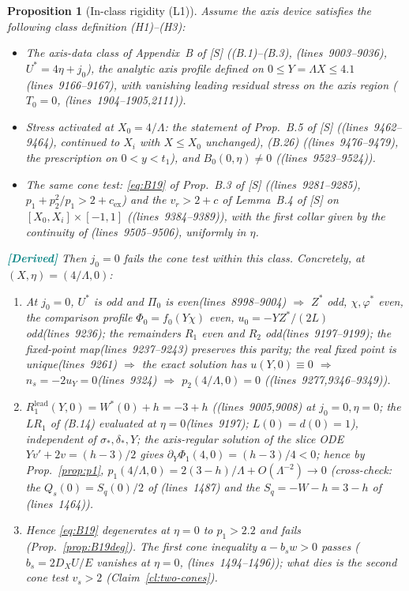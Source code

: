 \documentclass[11pt,a4paper]{article}
\newtheorem{proposition}[theorem]{Proposition}
\theoremstyle{definition}
\theoremstyle{remark}
\newcommand{\lnos}[1]{(lines~#1)}
\newcommand{\DER}{\textcolor{teal}{\textbf{[Derived]}}}
\begin{document}
\begin{proposition}[In-class rigidity (L1)]
\label{prop:L1}
Assume the axis device satisfies the following class definition (H1)--(H3):
\begin{itemize}
\item[(H1)] The axis-data class of Appendix~B of [S] ((B.1)--(B.3), \lnos{9003--9036},
$U^*=4\eta+j_0$), the analytic axis profile defined on $0\le Y=\Lambda X\le 4.1$\lnos{9166--9167},
with vanishing leading residual stress on the axis region ($T_0=0$, \lnos{1904--1905,2111}).
\item[(H2)] Stress activated at $X_0=4/\Lambda$: the statement of Prop.~B.5 of [S] (\lnos{9462--9464},
continued to $X_i$ with $X\le X_0$ unchanged), (B.26) (\lnos{9476--9479}, the prescription on
$0<y<t_1$), and $B_0(0,\eta)\ne 0$ (\lnos{9523--9524}).
\item[(H3)] The same cone test: \eqref{eq:B19} of Prop.~B.3 of [S] (\lnos{9281--9285},
$p_1+p_2^2/p_1>2+c_{\mathrm{ex}}$) and the $v_r>2+c$ of Lemma~B.4 of [S] on
$[X_0,X_i]\times[-1,1]$ (\lnos{9384--9389}), with the first collar given by the continuity of
\lnos{9505--9506}, uniformly in $\eta$.
\end{itemize}
\DER
Then $j_0=0$ fails the cone test within this class. Concretely, at $(X,\eta)=(4/\Lambda,0)$:
\begin{enumerate}
\item At $j_0=0$, $U^*$ is odd and $\Pi_0$ is even\lnos{8998--9004} $\Rightarrow$ $Z^*$ odd,
$\chi,\varphi^*$ even, the comparison profile $\Phi_0=f_0(Y\chi)$ even, $u_0=-YZ^*/(2L)$ odd\lnos{9236};
the remainders $R_1$ even and $R_2$ odd\lnos{9197--9199}; the fixed-point map\lnos{9237--9243}
preserves this parity; the real fixed point is unique\lnos{9261} $\Rightarrow$ the exact solution has
$u(Y,0)\equiv 0$
$\Rightarrow$ $n_s=-2u_Y=0$\lnos{9324} $\Rightarrow$ $p_2(4/\Lambda,0)=0$
(\lnos{9277,9346--9349}).
\item $R_1^{\mathrm{lead}}(Y,0)=W^*(0)+h=-3+h$ (\lnos{9005,9008} at
$j_0=0,\eta=0$; the $LR_1$ of (B.14) evaluated at $\eta=0$\lnos{9197}; $L(0)=d(0)=1$), independent of
$\sigma_*,\delta_*,Y$; the axis-regular solution of the slice ODE
$Yv'+2v=(h-3)/2$ gives $\partial_Y\Phi_1(4,0)=(h-3)/4<0$;
hence by Prop.~\ref{prop:p1}, $p_1(4/\Lambda,0)=2(3-h)/\Lambda+O(\Lambda^{-2})\to 0$
(cross-check: the $Q_s(0)=S_q(0)/2$ of \lnos{1487} and the $S_q=-W-h=3-h$ of \lnos{1464}).
\item Hence \eqref{eq:B19} degenerates at $\eta=0$ to $p_1>2.2$ and fails (Prop.~\ref{prop:B19deg}).
The first cone inequality $a-b_sw>0$ passes ($b_s=2D_XU/E$ vanishes at $\eta=0$, \lnos{1494--1496});
what dies is the second cone test $v_s>2$ (Claim~\ref{cl:two-cones}).
\end{enumerate}
\end{proposition}
\end{document}
